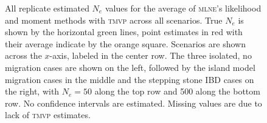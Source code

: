 \begin{landscape}
\begin{figure}[ht]
\centering
{}
\caption[All replicate estimated $N_e$ values for the average of \textsc{mlne}'s likelihood and moment methods with \textsc{tmvp} across all scenarios.]{All replicate estimated $N_e$ values for the average of \textsc{mlne}'s likelihood and moment methods with \textsc{tmvp} across all scenarios. True $N_e$ is shown by the horizontal green lines, point estimates in red with their average indicate by the orange square. Scenarios are shown across the $x$-axis, labeled in the center row. The three isolated, no migration cases are shown on the left, followed by the island model migration cases in the middle and the stepping stone IBD cases on the right, with $N_e = 50$ along the top row and 500 along the bottom row. No confidence intervals are estimated. Missing values are due to lack of \textsc{tmvp} estimates.}
\label{fig:supp_avg4}
\end{figure}



\end{landscape}
